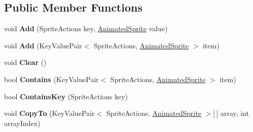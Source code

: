 \subsection*{Public Member Functions}
\begin{DoxyCompactItemize}
\item 
\mbox{\label{class_super_mario_1_1_graphics_1_1_animated_sprite_dictionary_a960f361d619281f48fb89304d2b53f25}} 
void {\bfseries Add} (Sprite\+Actions key, \mbox{\hyperlink{class_super_mario_1_1_graphics_1_1_animated_sprite}{Animated\+Sprite}} value)
\item 
\mbox{\label{class_super_mario_1_1_graphics_1_1_animated_sprite_dictionary_ae62452172370e7431f4a66f2da863e88}} 
void {\bfseries Add} (Key\+Value\+Pair$<$ Sprite\+Actions, \mbox{\hyperlink{class_super_mario_1_1_graphics_1_1_animated_sprite}{Animated\+Sprite}} $>$ item)
\item 
\mbox{\label{class_super_mario_1_1_graphics_1_1_animated_sprite_dictionary_aebf2c07421f4d13d85be04f3a1a93c8b}} 
void {\bfseries Clear} ()
\item 
\mbox{\label{class_super_mario_1_1_graphics_1_1_animated_sprite_dictionary_a42033bece722801e46cff223c542bc4f}} 
bool {\bfseries Contains} (Key\+Value\+Pair$<$ Sprite\+Actions, \mbox{\hyperlink{class_super_mario_1_1_graphics_1_1_animated_sprite}{Animated\+Sprite}} $>$ item)
\item 
\mbox{\label{class_super_mario_1_1_graphics_1_1_animated_sprite_dictionary_aeffcc0114d3e5a21e64ebb6bb9095fab}} 
bool {\bfseries Contains\+Key} (Sprite\+Actions key)
\item 
\mbox{\label{class_super_mario_1_1_graphics_1_1_animated_sprite_dictionary_a8f3cacc1cffd58e8cd422abddba1c660}} 
void {\bfseries Copy\+To} (Key\+Value\+Pair$<$ Sprite\+Actions, \mbox{\hyperlink{class_super_mario_1_1_graphics_1_1_animated_sprite}{Animated\+Sprite}} $>$\mbox{[}$\,$\mbox{]} array, int array\+Index)

\end{DoxyCompactItemize}
